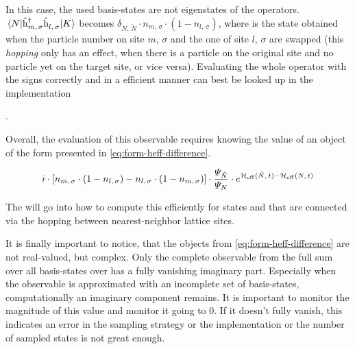 In this case, the used basis-states are not eigenstates of the operators. 
$\bracketHelper{N}{\withspinhcop{m}{\sigma}{\dagger}\withspinhcop{l}{\sigma}{}}{K}$ becomes $\delta_{N,\,\tilde{N}}\cdot n_{m,\,\sigma} \cdot (1-n_{l,\,\sigma} )$, where  is the state obtained when the particle number on site $m,\, \sigma$ and the one of site $l,\, \sigma$ are swapped (this \emph{hopping} only has an effect, when there is a particle on the original site and no particle yet on the target site, or vice versa).
Evaluating the whole operator with the signs correctly and in a efficient manner can best be looked up in the implementation 

.

Overall, the evaluation of this observable requires knowing the value of an object of the form presented in \autoref{eq:form-heff-difference}.

\begin{equation}
    \label{eq:form-heff-difference}
    i \cdot 
    \left[
        n_{m,\,\sigma} \cdot (1-n_{l,\,\sigma})
        -
        n_{l,\,\sigma} \cdot (1-n_{m,\,\sigma})
    \right]
    \cdot 
    \frac{\psiN[\tilde{N}]}{\psiN}
    \cdot 
     e^{\HeffOft[\tilde{N}]-\HeffOft[N]}
\end{equation}

The  will go into how to compute this efficiently for states \ketN[N] and  that are connected via the hopping between nearest-neighbor lattice sites.

It is finally important to notice, that the objects from \autoref{eq:form-heff-difference} are not real-valued, but complex.
Only the complete observable from the full sum over all basis-states \ketN over  has a fully vanishing imaginary part. 
Especially when the observable is approximated with an incomplete set of basis-states, computationally an imaginary component remains. 
It is important to monitor the magnitude of this value and monitor it going to $0$.
If it doesn't fully vanish, this indicates an error in the sampling strategy or the implementation or the number of sampled states is not great enough.

